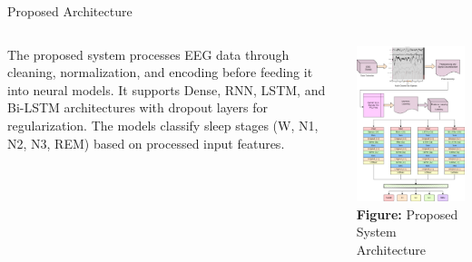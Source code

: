 \begin{frame}{Proposed Architecture}
	\small
	\begin{columns}
		\begin{column}{0.6\textwidth}
			The proposed system processes EEG data through cleaning, normalization, and encoding before feeding it into neural models. It supports Dense, RNN, LSTM, and Bi-LSTM architectures with dropout layers for regularization. The models classify sleep stages (W, N1, N2, N3, REM) based on processed input features.
		\end{column}
		\begin{column}{0.3\textwidth}
			\centering
			\includegraphics[width=\linewidth]{images/paper_2/aRCHITECHTURE 2} \\
			\textbf{Figure:} Proposed System Architecture
		\end{column}
	\end{columns}
\end{frame}




